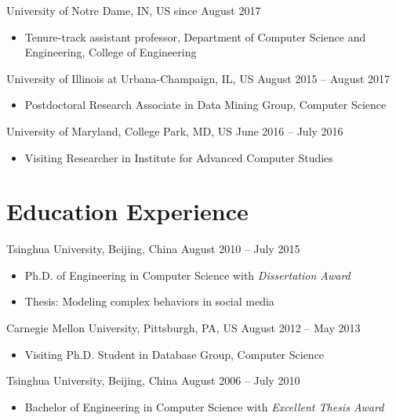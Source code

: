 \documentclass[margin, 9pt]{res}
\begin{document}
\begin{resume}
{University of Notre Dame, IN, US} \hfill{since August 2017}
\begin{itemize}
	\item Tenure-track assistant professor, Department of Computer Science and Engineering, College of Engineering
\end{itemize}
\vspace{-0.1in}
{University of Illinois at Urbana-Champaign, IL, US} \hfill{August 2015 -- August 2017}
\begin{itemize}
	\item Postdoctoral Research Associate in Data Mining Group, Computer Science
\end{itemize}
\vspace{-0.1in}
{University of Maryland, College Park, MD, US} \hfill{June 2016 -- July 2016}
\begin{itemize}
	\item Visiting Researcher in Institute for Advanced Computer Studies
\end{itemize}


\section{Education Experience}

{Tsinghua University, Beijing, China} \hfill{August 2010 -- July 2015}
\begin{itemize}
\item Ph.D. of Engineering in Computer Science with \textit{Dissertation Award}
\item Thesis: Modeling complex behaviors in social media
\end{itemize}
\vspace{-0.1in}
{Carnegie Mellon University, Pittsburgh, PA, US} \hfill{August 2012 -- May 2013}
\begin{itemize}
\item Visiting Ph.D. Student in Database Group, Computer Science
\end{itemize}
\vspace{-0.1in}
{Tsinghua University, Beijing, China} \hfill{August 2006 -- July 2010}
\begin{itemize}
\item Bachelor of Engineering in Computer Science with \textit{Excellent Thesis Award}
\end{itemize}


\end{resume}
\end{document}
